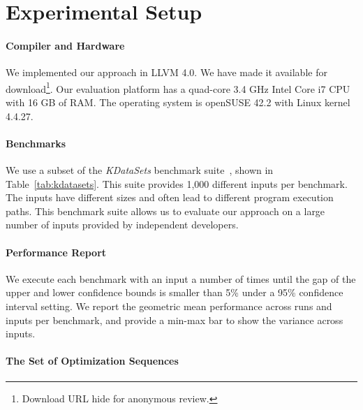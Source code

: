 \section{Experimental Setup}\label{sec:setup}

\paragraph{Compiler and Hardware} We implemented our approach in LLVM 4.0.
We have made it available for download\footnote{Download URL hide for anonymous review.}.
Our evaluation platform has a quad-core 3.4 GHz Intel Core i7 CPU with 16 GB of RAM.
The operating system is openSUSE 42.2 with Linux kernel 4.4.27.


\paragraph{Benchmarks}
We use a subset of the \textit{KDataSets} benchmark suite~\cite{chen10,chen12a},
shown in Table~\ref{tab:kdatasets}.
This suite provides 1,000 different inputs per benchmark.
The inputs have different sizes and often lead to different program execution paths.
This benchmark suite allows us to evaluate our approach on a large number of inputs provided by independent
developers.





\paragraph{Performance Report}
We execute each benchmark with an input a number of times until the gap of the upper and lower confidence bounds is smaller than 5\% under
a 95\% confidence interval setting. We report the geometric mean performance across runs and inputs per benchmark, and provide a min-max
bar to show the variance across inputs.


\paragraph{The Set of Optimization Sequences}

